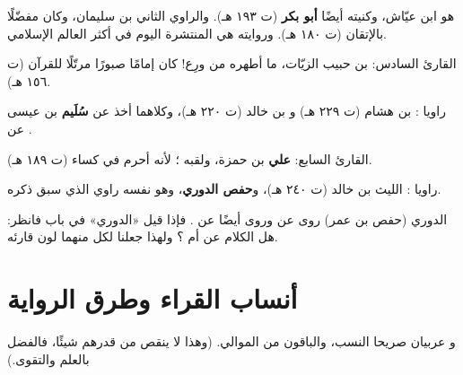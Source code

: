 \maana \Shuba{} هو ابن عيّاش، وكنيته أيضًا \textbf{أبو بكر} (ت ١٩٣ هـ). والراوي الثاني \Hafs{} بن سليمان، وكان مفضّلًا بالإتقان (ت ١٨٠ هـ). وروايته هي المنتشرة اليوم في أكثر العالم الإسلامي.

\maana القارئ السادس: \Hamza{} بن حبيب الزيّات، ما أطهره من ورِع! كان إمامًا صبورًا مرتّلًا للقرآن (ت ١٥٦ هـ).

\maana راويا \Hamza: \Khalaf{} بن هشام (ت ٢٢٩ هـ) و\Khallad{} بن خالد (ت ٢٢٠ هـ)، وكلاهما أخذ عن \textbf{سُلَيم} بن عيسى عن \Hamza.

\begin{mufradat}
\end{mufradat}
\maana القارئ السابع: \textbf{علي} بن حمزة، ولقبه \Kisai؛ لأنه أحرم في كساء (ت ١٨٩ هـ).

\begin{mufradat}
\end{mufradat}
\maana راويا \Kisai: \AbulHarith{} الليث بن خالد (ت ٢٤٠ هـ)، و\textbf{حفص الدوري}، وهو نفسه راوي \AbiAmr{} الذي سبق ذكره.

\begin{tanbih}
الدوري (حفص بن عمر) روى عن \AbiAmr{} وروى أيضًا عن \Kisai. فإذا قيل «الدوري» في باب فانظر: هل الكلام عن \AbiAmr{} أم \Kisai؟ ولهذا جعلنا لكل منهما لون قارئه.
\end{tanbih}

\section{أنساب القراء وطرق الرواية}
\begin{mufradat}
\end{mufradat}
\maana \AbuAmr{} و\IbnAmir{} عربيان صريحا النسب، والباقون من الموالي. (وهذا لا ينقص من قدرهم شيئًا، فالفضل بالعلم والتقوى.)

